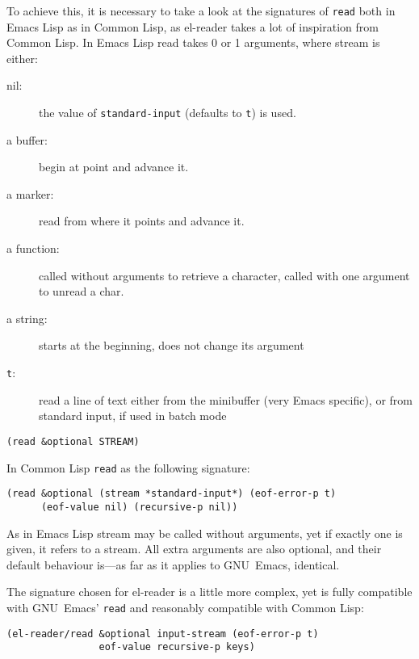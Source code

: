 \documentclass[a4paper,10pt,twoside]{article}
\newcommand{\el}{Emacs Lisp}
\newcommand{\cl}{Common Lisp}
\newcommand{\elr}{el-reader}
\newcommand{\sym}[1]{\texttt{#1}}
\newcommand{\fun}[1]{\texttt{#1}}
\newcommand{\emacs}{GNU~Emacs}
\newcommand{\Read}{\fun{read}}
\begin{document}
To achieve this, it is necessary to take a look at the signatures of \Read{}
both in \el{} as in \cl{}, as \elr{} takes a lot of inspiration from \cl{}.  In
\el{} read takes 0 or 1 arguments, where stream is either:
\begin{description}
\item[nil:] the value of \sym{standard-input} (defaults to \sym{t}) is used.
\item[a buffer:] begin at point and advance it.
\item[a marker:] read from where it points and advance it.
\item[a function:] called without arguments to retrieve a character, called with
  one argument to unread a char.
\item[a string:] starts at the beginning, does not change its argument
\item[\sym{t}:] read a line of text either from the minibuffer (very Emacs
  specific), or from standard input, if used in batch mode
\end{description}

\begin{lstlisting}[style=lispinline]
(read &optional STREAM)
\end{lstlisting}

In \cl{} \Read{} as the following signature:

\begin{lstlisting}[style=lispinline]
(read &optional (stream *standard-input*) (eof-error-p t)
      (eof-value nil) (recursive-p nil))
\end{lstlisting}

As in \el{} stream may be called without arguments, yet if exactly one is given,
it refers to a stream.  All extra arguments are also optional, and their default
behaviour is---as far as it applies to \emacs{}, identical.

The signature chosen for \elr{} is a little more complex, yet is fully
compatible with \emacs{}’ \Read{} and reasonably compatible with \cl{}:

\begin{lstlisting}[style=lispinline]
(el-reader/read &optional input-stream (eof-error-p t)
                eof-value recursive-p keys)
\end{lstlisting}
\end{document}
